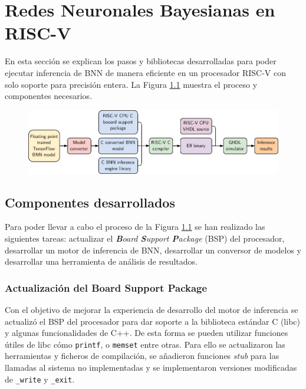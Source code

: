 \chapter{Redes Neuronales Bayesianas en RISC-V}

En esta sección se explican los pasos y bibliotecas desarrolladas para poder ejecutar inferencia de BNN de manera eficiente en un procesador RISC-V con solo soporte para precisión entera. La Figura \ref{fig:experiment_pipeline} muestra el proceso y componentes necesarios.

\begin{figure}[h]
    \centering
    \includegraphics[width=\textwidth]{root/Imagenes/4_bnn_riscv/experiment_pipeline.pdf}
    \caption{\todo}
    \label{fig:experiment_pipeline}
\end{figure}

\section{Componentes desarrollados}

Para poder llevar a cabo el proceso de la Figura \ref{fig:experiment_pipeline} se han realizado las siguientes tareas: actualizar el \textit{\textbf{B}oard \textbf{S}upport \textbf{P}ackage} (BSP) del procesador, desarrollar un motor de inferencia de BNN, desarrollar un conversor de modelos y desarrollar una herramienta de análisis de resultados.

\subsection{Actualización del Board Support Package}

Con el objetivo de mejorar la experiencia de desarrollo del motor de inferencia se actualizó el BSP del procesador para dar soporte a la biblioteca estándar C (libc) y algunas funcionalidades de C++. De esta forma se pueden utilizar funciones útiles de libc cómo \texttt{printf}, o \texttt{memset} entre otras. Para ello se actualizaron las herramientas y ficheros de compilación, se añadieron funciones \textit{stub} para las llamadas al sistema no implementadas y se implementaron versiones modificadas de \texttt{\_write} y \texttt{\_exit}.

